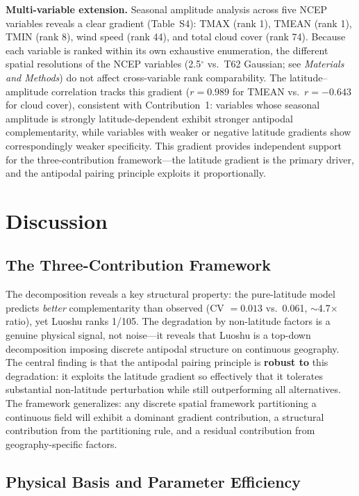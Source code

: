 \documentclass[9pt,twocolumn]{article}
\begin{document}
\textbf{Multi-variable extension.} Seasonal amplitude analysis across five NCEP variables reveals a clear gradient (Table~S4): TMAX (rank 1), TMEAN (rank 1), TMIN (rank 8), wind speed (rank 44), and total cloud cover (rank 74). Because each variable is ranked within its own exhaustive enumeration, the different spatial resolutions of the NCEP variables (2.5$^\circ$ vs.\ T62 Gaussian; see \textit{Materials and Methods}) do not affect cross-variable rank comparability. The latitude--amplitude correlation tracks this gradient ($r = 0.989$ for TMEAN vs.\ $r = -0.643$ for cloud cover), consistent with Contribution~1: variables whose seasonal amplitude is strongly latitude-dependent exhibit stronger antipodal complementarity, while variables with weaker or negative latitude gradients show correspondingly weaker specificity. This gradient provides independent support for the three-contribution framework---the latitude gradient is the primary driver, and the antipodal pairing principle exploits it proportionally.

\section*{Discussion}

\subsection*{The Three-Contribution Framework}

The decomposition reveals a key structural property: the pure-latitude model predicts \textit{better} complementarity than observed (CV $= 0.013$ vs.\ 0.061, $\sim$4.7$\times$ ratio), yet Luoshu ranks 1/105. The degradation by non-latitude factors is a genuine physical signal, not noise---it reveals that Luoshu is a top-down decomposition imposing discrete antipodal structure on continuous geography. The central finding is that the antipodal pairing principle is \textbf{robust to} this degradation: it exploits the latitude gradient so effectively that it tolerates substantial non-latitude perturbation while still outperforming all alternatives. The framework generalizes: any discrete spatial framework partitioning a continuous field will exhibit a dominant gradient contribution, a structural contribution from the partitioning rule, and a residual contribution from geography-specific factors.

\subsection*{Physical Basis and Parameter Efficiency}
\end{document}
